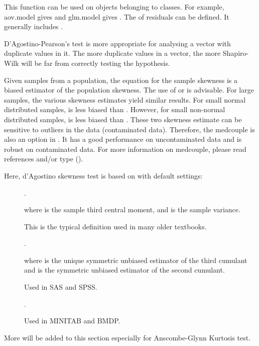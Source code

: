 \documentclass[a4paper]{book}
\begin{document}
\begin{Details}\relax
This function can be used on objects belonging to  classes. 
For example, aov.model\code{)} gives  and glm.model\code{)} 
gives . The  of residuals can be defined. It generally includes 
.

D'Agostino-Pearson's test is more appropriate for analysing a vector with
duplicate values in it. The more duplicate values in a vector, the more
Shapiro-Wilk will be far from correctly testing the  hypothesis.

Given samples from a population, the equation for the sample skewness 
is a biased estimator of the population skewness. The use of  or  is advisable.
For large samples, the various skewness estimates yield similar results. For small
normal distributed samples,  is less biased than .
However, for small non-normal distributed samples,  is less biased than .
These two skewness estimate can be sensitive to outliers in the data (contaminated data).
Therefore, the medcouple  is also an option in . It has a good
performance on uncontaminated data and is robust on contaminated data.
For more information on medcouple, please read references and/or type  ().

Here, d'Agostino skewness test is based on  with default settings:

\begin{description}

\item[] 
.

where  is the sample third central moment, and  is the sample variance.

This is the typical definition used in many older textbooks.

\item[] 
.

where  is the unique symmetric unbiased estimator of the third
cumulant and  is the symmetric unbiased estimator of the second cumulant.

Used in SAS and SPSS.

\item[] 
.

Used in MINITAB and BMDP.


\end{description}



More will be added to this section especially for Anscombe-Glynn Kurtosis test.
\end{Details}
\end{document}
